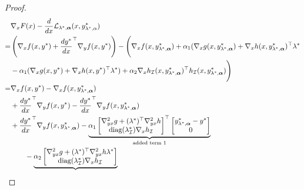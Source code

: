 \begin{proof}
\begin{align}
    \footnotesize
    & \nabla_x F(x) - \frac{d}{dx} \mathcal{L}_{\lambda^*,\boldsymbol{\alpha}}(x,y_{\lambda^*,\alpha}^*) \nonumber \\
    = & \left( \nabla_x f(x,y^*) + \frac{d y^*}{d x}^\top \nabla_y f(x,y^*) \right) - \Biggl( \nabla_x f(x,y_{\lambda^*,\boldsymbol{\alpha}}^*) + \alpha_1 (\nabla_x g(x,y_{\lambda^*,\boldsymbol{\alpha}}^*) + \nabla_x h(x,y_{\lambda^*,\boldsymbol{\alpha}}^*)^\top \lambda^* \nonumber \\
    &  - \alpha_1(\nabla_x g(x,y^*) + \nabla_x h(x,y^*)^\top \lambda^*) 
    + \alpha_2
    \nabla_x h_\mathcal{I}(x,y_{\lambda^*,\boldsymbol{\alpha}}^*)^\top h_\mathcal{I}(x,y_{\lambda^*,\boldsymbol{\alpha}}^*)
\Biggl) \nonumber \\
    = & \nabla_x f(x,y^*) - \nabla_x f(x,y_{\lambda^*,\boldsymbol{\alpha}}^*) \label{eqn:f-difference} \\
    & + \frac{d y^*}{d x}^\top \nabla_y f(x,y^*) - \frac{d y^*}{d x}^\top \nabla_y f(x,y_{\lambda^*,\boldsymbol{\alpha}}^*) \label{eqn:df-difference} \\ 
    & + \frac{d y^*}{d x}^\top \nabla_y f(x,y_{\lambda^*,\boldsymbol{\alpha}}^*) - \underbrace{\alpha_1 \begin{bmatrix}
        \nabla^2_{yx} g + (\lambda^*)^\top \nabla_{yx}^2 h \\
        \text{diag}(\lambda^*_\mathcal{I}) \nabla_x h_\mathcal{I}
    \end{bmatrix}^\top  \begin{bmatrix}
        y_{\lambda^*,\boldsymbol{\alpha}}^* - y^*  \\
        0
    \end{bmatrix} }_{\text{added term 1}} \nonumber\\
    &\qquad- \underbrace{\alpha_2 \begin{bmatrix}
        \nabla^2_{yx} g + (\lambda^*)^\top \nabla_{yx}^2 h \lambda^* \\
        \text{diag}(\lambda^*_\mathcal{I}) \nabla_x h_\mathcal{I}

\end{bmatrix}}
\end{align}
\end{proof}
